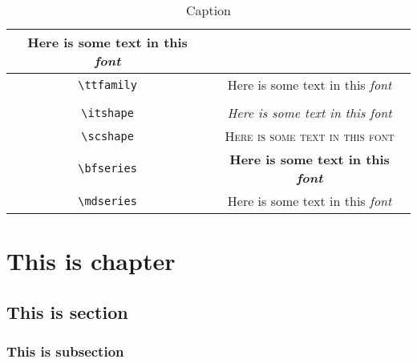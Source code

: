 \begin{table}[t]
\begin{tabular}{c|c}
         \sffamily\mdseries Here is some text in this {\em font} \\
         \midrule
          \verb!\ttfamily! &  
         \ttfamily Here is some text in this {\em font} \\ \\
         \verb!\itshape! & 
         \ttfamily\itshape Here is some text in this {\em font} \\
         \verb!\scshape! & 
         \ttfamily\scshape Here is some text in this font \\
         \verb!\bfseries! & 
         \ttfamily\bfseries Here is some text in this {\em font} \\
         \verb!\mdseries! & 
         \ttfamily\mdseries Here is some text in this {\em font} \\
         \midrule
         
    \end{tabular}
    \caption{Caption}
    \label{tab:my_label}
\end{table}

\chapter{This is chapter}
\section{This is section}
\subsection{This is subsection}